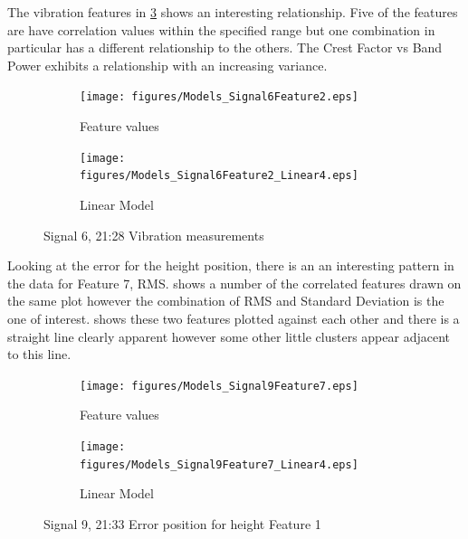 \documentclass[]{article}
\begin{document}
The vibration features in \cref{fig:Models_Signal6Feature2_Caption} shows an interesting relationship. Five of the features are have correlation values within the specified range but one combination in particular has a different relationship to the others. The Crest Factor vs Band Power exhibits a relationship with an increasing variance. 
\begin{figure}[H]
    \centering
		\begin{subfigure}{.5\textwidth}
		  	\centering
    			\texttt{[image: figures/Models\_Signal6Feature2.eps]}
		  	\caption{Feature values}
		  	\label{fig:Models_Signal6Feature1}
		\end{subfigure}%
		\begin{subfigure}{.5\textwidth}
		  	\centering
 		   	\texttt{[image: figures/Models\_Signal6Feature2\_Linear4.eps]}
		  	\caption{Linear Model}
		  	\label{fig:Models_Signal6Feature2_Linear4}
		\end{subfigure}
    \caption{Signal 6, 21:28 Vibration measurements}
    \label{fig:Models_Signal6Feature2_Caption}
\end{figure}


Looking at the error for the height position, there is an an interesting pattern in the data for Feature 7, \gls{RMS}.  shows a number of the correlated features drawn on the same plot however the combination of \gls{RMS} and Standard Deviation is the one of interest.  shows these two features plotted against each other and there is a straight line clearly apparent however some other little clusters appear adjacent to this line.
\begin{figure}[H]
    \centering
		\begin{subfigure}{.5\textwidth}
		  	\centering
    			\texttt{[image: figures/Models\_Signal9Feature7.eps]}
		  	\caption{Feature values}
		  	\label{fig:Models_Signal9Feature7}
		\end{subfigure}%
		\begin{subfigure}{.5\textwidth}
		  	\centering
 		   	\texttt{[image: figures/Models\_Signal9Feature7\_Linear4.eps]}
		  	\caption{Linear Model}
		  	\label{fig:Models_Signal9Feature7_Linear4}
		\end{subfigure}
    \caption{Signal 9, 21:33 Error position for height Feature 1}
    \label{fig:Models_Signal9Feature7_Caption}
\end{figure}
\end{document}
